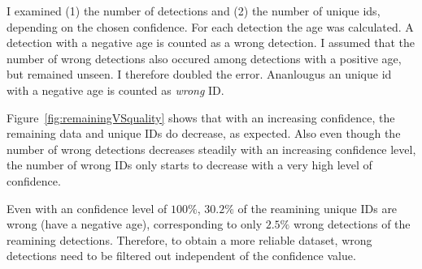 I examined (1) the number of detections and (2) the number of unique ids, depending on the chosen confidence.
For each detection the age was calculated. A detection with a negative age is counted as a wrong detection. I assumed that the number of wrong detections also occured among detections with a positive age, but remained unseen. I therefore doubled the error.
Ananlougus an unique id with a negative age is counted as \emph{wrong} ID.

Figure~\ref{fig:remainingVSquality} shows that with an increasing confidence, the remaining data and unique IDs do decrease, as expected. Also even though the number of wrong detections decreases steadily with an increasing confidence level, the number of wrong IDs only starts to decrease with a very high level of confidence.

Even with an confidence level of $100\%$, $30.2\%$ of the reamining unique IDs are wrong (have a negative age), corresponding to only $2.5\%$ wrong detections of the reamining detections. Therefore, to obtain a more reliable dataset, wrong detections need to be filtered out independent of the confidence value.


